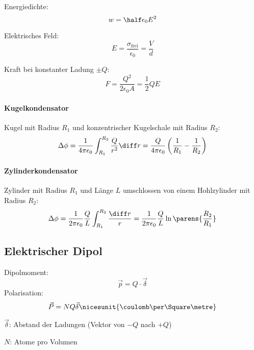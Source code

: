 			Energiedichte:
			\begin{equation*}
				w = \half \epsilon_0 E^2
			\end{equation*}
			
			Elektrisches Feld:
			\[
				E = \frac{\sigma_\text{frei}}{\epsilon_0} = \frac{V}{d}
			\]
			
			Kraft bei konstanter Ladung $\pm Q$:
			\begin{equation*}
				F = \frac{Q^2}{2\epsilon_0 A} = \frac{1}{2} Q E
			\end{equation*}
		
		\paragraph{Kugelkondensator} %
			Kugel mit Radius $R_1$ und konzentrischer Kugelschale mit Radius $R_2$:
			\begin{equation*}
				\Delta \phi = \frac{1}{4\pi\epsilon_0} \int_{R_1}^{R_2} \frac{Q}{r^2} \diff r = \frac{Q}{4\pi\epsilon_0} \left(\frac{1}{R_1}-\frac{1}{R_2}\right)
			\end{equation*}
		
		\paragraph{Zylinderkondensator} %
			Zylinder mit Radius $R_1$ und Länge $L$ umschlossen von einem Hohlzylinder mit Radius $R_2$:
			\begin{equation*}
				\Delta \phi = \frac{1}{2\pi\epsilon_0} \frac{Q}{L} \int_{R_1}^{R_2} \frac{\diff r}{r} = \frac{1}{2\pi\epsilon_0} \frac{Q}{L} \ln \parens{\frac{R_2}{R_1}}
			\end{equation*}
	\subsection{Elektrischer Dipol} %
		Dipolmoment:
		\begin{equation*}
			\vec p = Q \cdot \vec \delta
		\end{equation*}
		Polarisation:
		\begin{equation*}
			\vec P = N Q \vec \delta \nicesunit{\coulomb\per\Square\metre}
		\end{equation*}
		\begin{tightitemize}
			\item[$\vec \delta$:] Abstand der Ladungen (Vektor von $-Q$ nach $+Q$)
			\item[$N$:] Atome pro Volumen
		\end{tightitemize}
